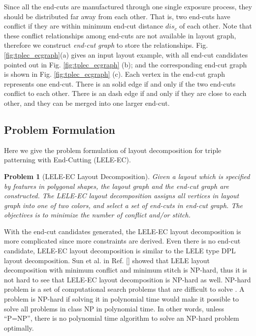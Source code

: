 \documentclass[12pt]{spieman}
\theoremstyle{plain}
\newtheorem{myproblem}{Problem}
\begin{document}
\begin{spacing}{1}
Since all the end-cuts are manufactured through one single exposure process, they should be distributed far away from each other.
That is, two end-cuts have conflict if they are within minimum end-cut distance $dis_c$ of each other.
Note that these conflict relationships among end-cuts are not available in layout graph, therefore we construct \textit{end-cut graph} to store the relationships.
Fig. \ref{fig:tplec_ecgraph}(a) gives an input layout example,
with all end-cut candidates pointed out in Fig. \ref{fig:tplec_ecgraph} (b);
and the corresponding end-cut graph is shown in Fig. \ref{fig:tplec_ecgraph} (c).
Each vertex in the end-cut graph represents one end-cut.
There is an solid edge if and only if the two end-cuts conflict to each other.
There is an dash edge if and only if they are close to each other, and they can be merged into one larger end-cut. 

\subsection{Problem Formulation}

Here we give the problem formulation of layout decomposition for triple patterning with End-Cutting (LELE-EC).

\begin{myproblem}[LELE-EC Layout Decomposition]
Given a layout which is specified by features in polygonal shapes, the layout graph and the end-cut graph are constructed.
The LELE-EC layout decomposition assigns all vertices in layout graph into one of two colors, and select a set of end-cuts in end-cut graph.
The objectives is to minimize the number of conflict and/or stitch.
\end{myproblem}

With the end-cut candidates generated, the LELE-EC layout decomposition is more complicated since more constraints are derived.
Even there is no end-cut candidate, LELE-EC layout decomposition is similar to the LELE type DPL layout decomposition.
Sun et al. in Ref. [] showed that LELE layout decomposition with minimum conflict and minimum stitch is NP-hard,
thus it is not hard to see that LELE-EC layout decomposition is NP-hard as well.
NP-hard problem is a set of computational search problems that are difficult to solve
\cite{book90Algorithm}.
A problem is NP-hard if solving it in polynomial time would make it possible to solve all problems in class NP in polynomial time. 
In other words, unless ``P=NP'', there is no polynomial time algorithm to solve an NP-hard problem optimally.



\end{spacing}
\end{document}
